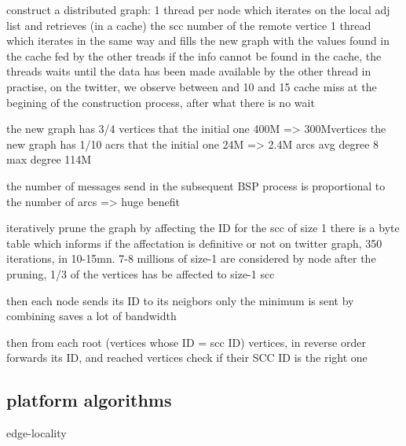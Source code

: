 \documentclass[11pt,a4paper]{article}
\begin{document}
construct a distributed graph:
1 thread per node which iterates on the local adj list and retrieves (in a cache) the scc number of the remote vertice
1 thread which iterates in the same way and fills the new graph with the values found in the cache fed by the other treads
if the info cannot be found in the cache, the threads waits until the data has been made available by the other thread
in practise, on the twitter, we observe between and 10 and 15 cache miss at the begining of the construction process, after what there  is no wait

the new graph has 3/4 vertices  that the initial one  400M =>  300Mvertices
the new graph has 1/10 acrs  that the initial one 24M => 2.4M arcs
avg degree  8
max degree 114M

the number of messages send in the subsequent BSP process is proportional to the number of arcs
=> huge benefit

iteratively prune the graph by affecting the ID for the scc of size 1
there is a byte table which informs if the affectation is definitive or not
on twitter graph, 350 iterations, in 10-15mn.
7-8 millions of size-1 are considered by node
after the pruning, 1/3 of the vertices has be affected to size-1 scc

then each node sends its ID to its neigbors
only the minimum is sent by combining saves a lot of bandwidth

then from each root (vertices whose ID = scc ID) vertices, in reverse order forwards its ID, and reached vertices check if their SCC ID is the right one











\subsection{platform algorithms}
edge-locality
\end{document}
